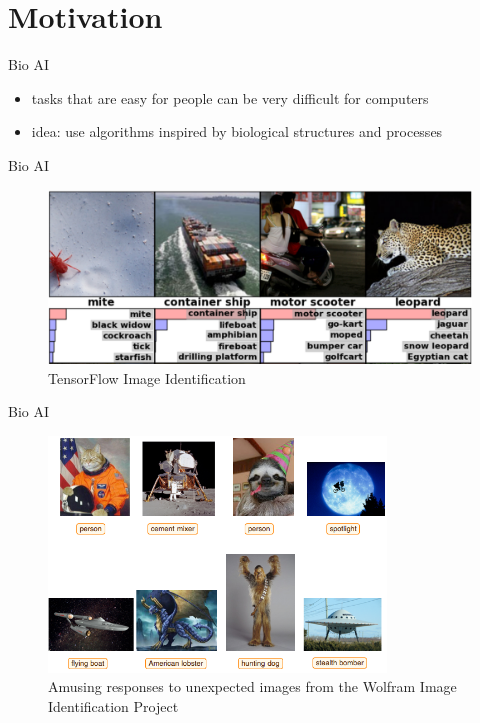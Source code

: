 \section{Motivation}

\begin{frame}{Bio AI}
\begin{itemize}
  \item tasks that are easy for people can be very difficult for computers
  \item idea: use algorithms inspired by biological structures and processes
\end{itemize}
\end{frame}

\begin{frame}{Bio AI}
\begin{figure}
\includegraphics[width=\textwidth]{img/AlexClassification.png}
\captionsetup{singlelinecheck=off,justification=raggedright}
\caption{TensorFlow Image Identification \cite{ImageRecognition}}
\end{figure}
\end{frame}

\begin{frame}{Bio AI}
\begin{figure}
\includegraphics[width=0.8\textwidth]{img/unexpected-images-tested-with-imageidentify.png}
\captionsetup{singlelinecheck=off,justification=raggedright}
\caption{Amusing responses to unexpected images from the Wolfram Image Identification Project \cite{Wolfram2015WolframProject}}
\end{figure}
\end{frame}

